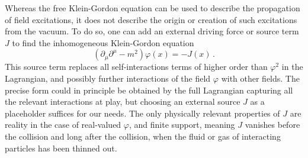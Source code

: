 Whereas the free Klein-Gordon equation can be used to describe the propagation of field excitations, it does not describe the origin or creation of such excitations from the vacuum. To do so, one can add an external driving force or source term $J$ to find the inhomogeneous Klein-Gordon equation
\begin{equation}
    (\partial_\mu\partial^\mu-m^2)\varphi(x)=-J(x)\,.
\end{equation}
This source term replaces all self-interactions terms of higher order than $\varphi^2$ in the Lagrangian, and possibly further interactions of the field $\varphi$ with other fields. The precise form could in principle be obtained by the full Lagrangian capturing all the relevant interactions at play, but choosing an external source $J$ as a placeholder suffices for our needs. The only physically relevant properties of $J$ are reality in the case of real-valued $\varphi$, and finite support, meaning $J$ vanishes before the collision and long after the collision, when the fluid or gas of interacting particles has been thinned out.

